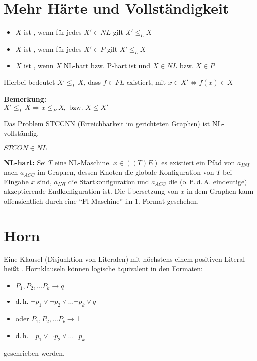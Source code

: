 \section{Mehr Härte und Vollständigkeit}

\begin{itemize}
\item $X$ ist , wenn für jedes $X'\in NL$ gilt $X' \leq_L X$
\item $X$ ist , wenn für jedes $X'\in P$ gilt $X' \leq_L X$
\item $X$ ist , wenn $X$ NL-hart bzw. P-hart ist und $X\in NL$ bzw. $X\in P$
\end{itemize}

Hierbei bedeutet $X' \leq_L X$, dass $f \in FL$ existiert, mit $x \in X' \Leftrightarrow f(x) \in X$

\textbf{Bemerkung:}\\
$X' \leq_L X \Rightarrow x \leq_P X, \text{ bzw. } X \leq X'$

\begin{satz}
    Das Problem STCONN (Erreichbarkeit im gerichteten Graphen) ist NL-vollständig.
\end{satz}

\begin{beweis}
    $STCON \in NL$ \checkmark

    \textbf{NL-hart:} Sei $T$ eine NL-Maschine. $x \in ((T) E)$
    es existiert ein Pfad von $a_{INI}$ nach $a_{ACC}$ im Graphen, dessen
    Knoten die globale Konfiguration von $T$ bei Eingabe $x$ sind, $a_{INI}$ die
    Startkonfiguration und $a_{ACC}$ die (o.\,B.\,d.\,A. eindeutige) akzeptierende Endkonfiguration ist. Die Übersetzung von $x$ in dem Graphen kann offensichtlich durch eine ``Fl-Maschine'' im 1. Format geschehen.
\end{beweis}





\section{Horn}


\begin{definition}
    Eine Klausel (Disjunktion von Literalen) mit höchstens einem positiven
    Literal heißt . Hornklauseln können logische äquivalent in
    den Formaten:
    \begin{itemize}
    \item $P_1, P_2, \dots P_k \rightarrow q$
    \item d.\,h. $\neg p_1 \lor \neg p_2 \lor \dots \neg p_k \lor q$
    \item oder $P_1, P_2, \dots P_k \rightarrow \bot$
    \item d.\,h. $\neg p_1 \lor \neg p_2 \lor \dots \neg p_k$
    \end{itemize}
    geschrieben werden.

\end{definition}



